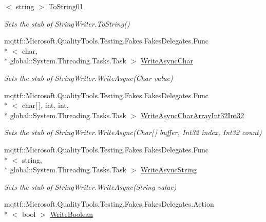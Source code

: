 \begin{DoxyCompactItemize}
$<$ string $>$ \hyperlink{class_system_1_1_i_o_1_1_fakes_1_1_stub_string_writer_ae067fb44d6e25fe11f952a800643c085}{To\-String01}
\begin{DoxyCompactList}\small\item\em Sets the stub of String\-Writer.\-To\-String()\end{DoxyCompactList}\item 
mqttf\-::\-Microsoft.\-Quality\-Tools.\-Testing.\-Fakes.\-Fakes\-Delegates.\-Func\\*
$<$ char, \\*
global\-::\-System.\-Threading.\-Tasks.\-Task $>$ \hyperlink{class_system_1_1_i_o_1_1_fakes_1_1_stub_string_writer_a45a5a41b19edd396a8df7b4050c7e969}{Write\-Async\-Char}
\begin{DoxyCompactList}\small\item\em Sets the stub of String\-Writer.\-Write\-Async(\-Char value)\end{DoxyCompactList}\item 
mqttf\-::\-Microsoft.\-Quality\-Tools.\-Testing.\-Fakes.\-Fakes\-Delegates.\-Func\\*
$<$ char\mbox{[}$\,$\mbox{]}, int, int, \\*
global\-::\-System.\-Threading.\-Tasks.\-Task $>$ \hyperlink{class_system_1_1_i_o_1_1_fakes_1_1_stub_string_writer_af816cc646aaf15afdd55b7dc81c72127}{Write\-Async\-Char\-Array\-Int32\-Int32}
\begin{DoxyCompactList}\small\item\em Sets the stub of String\-Writer.\-Write\-Async(\-Char\mbox{[}$\,$\mbox{]} buffer, Int32 index, Int32 count)\end{DoxyCompactList}\item 
mqttf\-::\-Microsoft.\-Quality\-Tools.\-Testing.\-Fakes.\-Fakes\-Delegates.\-Func\\*
$<$ string, \\*
global\-::\-System.\-Threading.\-Tasks.\-Task $>$ \hyperlink{class_system_1_1_i_o_1_1_fakes_1_1_stub_string_writer_a39b098ddef8b6862d2302ba4298c161b}{Write\-Async\-String}
\begin{DoxyCompactList}\small\item\em Sets the stub of String\-Writer.\-Write\-Async(\-String value)\end{DoxyCompactList}\item 
mqttf\-::\-Microsoft.\-Quality\-Tools.\-Testing.\-Fakes.\-Fakes\-Delegates.\-Action\\*
$<$ bool $>$ \hyperlink{class_system_1_1_i_o_1_1_fakes_1_1_stub_string_writer_a1f6044cf9a6bca0f968c8bc9bcdc87ba}{Write\-Boolean}

\end{DoxyCompactItemize}
